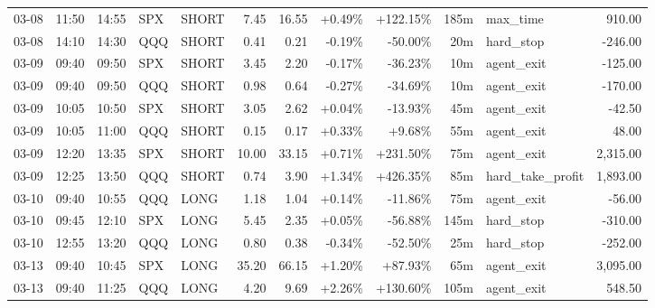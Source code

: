 \documentclass[11pt,a4paper,twoside]{article}
\begin{document}
\begin{center}
\begin{longtable}{>{\color{txtmain}}l l l l l r r r r r >{\color{txtmain}}l r}
03-08 & 11:50 & 14:55 & SPX & SHORT & 7.45 & 16.55 & \textcolor{wingreen}{+0.49\%} & \textcolor{wingreen}{+122.15\%} & 185m & max\_time & \textcolor{wingreen}{910.00} \\
03-08 & 14:10 & 14:30 & QQQ & SHORT & 0.41 & 0.21 & \textcolor{lossred}{-0.19\%} & \textcolor{lossred}{-50.00\%} & 20m & hard\_stop & \textcolor{lossred}{-246.00} \\
03-09 & 09:40 & 09:50 & SPX & SHORT & 3.45 & 2.20 & \textcolor{lossred}{-0.17\%} & \textcolor{lossred}{-36.23\%} & 10m & agent\_exit & \textcolor{lossred}{-125.00} \\
03-09 & 09:40 & 09:50 & QQQ & SHORT & 0.98 & 0.64 & \textcolor{lossred}{-0.27\%} & \textcolor{lossred}{-34.69\%} & 10m & agent\_exit & \textcolor{lossred}{-170.00} \\
03-09 & 10:05 & 10:50 & SPX & SHORT & 3.05 & 2.62 & \textcolor{wingreen}{+0.04\%} & \textcolor{lossred}{-13.93\%} & 45m & agent\_exit & \textcolor{lossred}{-42.50} \\
03-09 & 10:05 & 11:00 & QQQ & SHORT & 0.15 & 0.17 & \textcolor{wingreen}{+0.33\%} & \textcolor{wingreen}{+9.68\%} & 55m & agent\_exit & \textcolor{wingreen}{48.00} \\
03-09 & 12:20 & 13:35 & SPX & SHORT & 10.00 & 33.15 & \textcolor{wingreen}{+0.71\%} & \textcolor{wingreen}{+231.50\%} & 75m & agent\_exit & \textcolor{wingreen}{2,315.00} \\
03-09 & 12:25 & 13:50 & QQQ & SHORT & 0.74 & 3.90 & \textcolor{wingreen}{+1.34\%} & \textcolor{wingreen}{+426.35\%} & 85m & hard\_take\_profit & \textcolor{wingreen}{1,893.00} \\
03-10 & 09:40 & 10:55 & QQQ & LONG & 1.18 & 1.04 & \textcolor{wingreen}{+0.14\%} & \textcolor{lossred}{-11.86\%} & 75m & agent\_exit & \textcolor{lossred}{-56.00} \\
03-10 & 09:45 & 12:10 & SPX & LONG & 5.45 & 2.35 & \textcolor{wingreen}{+0.05\%} & \textcolor{lossred}{-56.88\%} & 145m & hard\_stop & \textcolor{lossred}{-310.00} \\
03-10 & 12:55 & 13:20 & QQQ & LONG & 0.80 & 0.38 & \textcolor{lossred}{-0.34\%} & \textcolor{lossred}{-52.50\%} & 25m & hard\_stop & \textcolor{lossred}{-252.00} \\
03-13 & 09:40 & 10:45 & SPX & LONG & 35.20 & 66.15 & \textcolor{wingreen}{+1.20\%} & \textcolor{wingreen}{+87.93\%} & 65m & agent\_exit & \textcolor{wingreen}{3,095.00} \\
03-13 & 09:40 & 11:25 & QQQ & LONG & 4.20 & 9.69 & \textcolor{wingreen}{+2.26\%} & \textcolor{wingreen}{+130.60\%} & 105m & agent\_exit & \textcolor{wingreen}{548.50} \\

\end{longtable}
\end{center}
\end{document}

